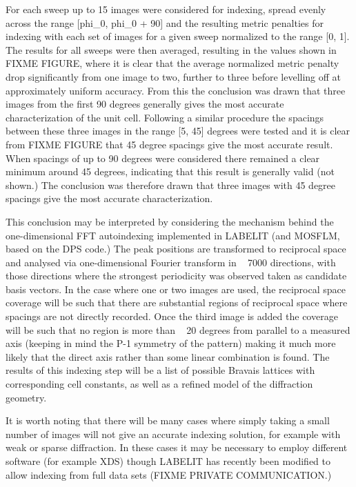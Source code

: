 \documentclass[a4paper, 11pt]{article}
\begin{document}
For each sweep up to 15 images were considered for indexing, spread evenly across the range [phi\_0, phi\_0 + 90] and the resulting metric penalties for indexing with each set of images for a given sweep normalized to the range [0, 1]. The results for all sweeps were then averaged, resulting in the values shown in FIXME FIGURE, where it is clear that the average normalized metric penalty drop significantly from one image to two, further to three before levelling off at approximately uniform accuracy. From this the conclusion was drawn that three images from the first 90 degrees generally gives the most accurate characterization of the unit cell. Following a similar procedure the spacings between these three images in the range [5, 45] degrees were tested and it is clear from FIXME FIGURE that 45 degree spacings give the most accurate result. When spacings of up to 90 degrees were considered there remained a clear minimum around 45 degrees, indicating that this result is generally valid (not shown.) The conclusion was therefore drawn that three images with 45 degree spacings give the most accurate characterization. 

This conclusion may be interpreted by considering the mechanism behind the one-dimensional FFT autoindexing implemented in LABELIT (and MOSFLM, based on the DPS code.) The peak positions are transformed to reciprocal space and analysed via one-dimensional Fourier transform in ~ 7000 directions, with those directions where the strongest periodicity was observed taken as candidate basis vectors. In the case where one or two images are used, the reciprocal space coverage will be such that there are substantial regions of reciprocal space where spacings are not directly recorded. Once the third image is added the coverage will be such that no region is more than ~ 20 degrees from parallel to a measured axis (keeping in mind the P-1 symmetry of the pattern) making it much more likely that the direct axis rather than some linear combination is found. The results of this indexing step will be a list of possible Bravais lattices with corresponding cell constants, as well as a refined model of the diffraction geometry.

It is worth noting that there will be many cases where simply taking a small number of images will not give an accurate indexing solution, for example with weak or sparse diffraction. In these cases it may be necessary to employ different software (for example XDS) though LABELIT has recently been modified to allow indexing from full data sets (FIXME PRIVATE COMMUNICATION.)
\end{document}
